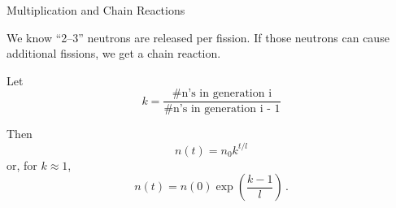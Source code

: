\documentclass[aspectratio=1610]{beamer}
\begin{document}
\begin{frame}{Multiplication and Chain Reactions}

We know ``2--3'' neutrons are released per fission.  If those neutrons can cause additional fissions, we get a chain reaction.

\vfill

Let 
\begin{equation*}
 k = \frac{\text{\# n's in generation i}}{\text{\# n's in generation i - 1}}
\end{equation*}

Then
\begin{equation*}
 n(t) = n_0 k^{t/l}
\end{equation*}
or, for $k \approx 1$, 
\begin{equation*}
 n(t) = n(0) \exp{ \left ( \frac{k-1}{l} \right ) } \, .
\end{equation*}





\end{frame}
\end{document}
